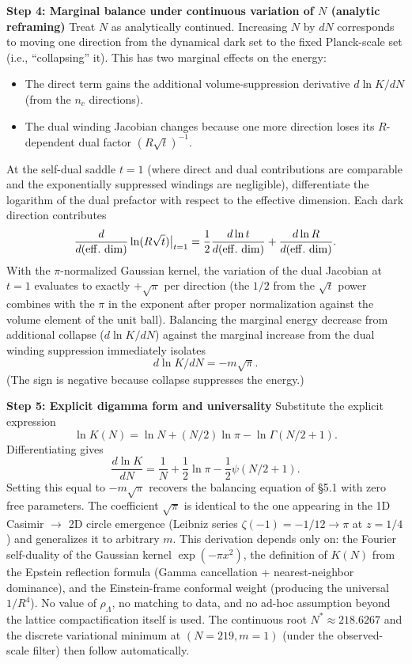 \documentclass[12pt,a4paper]{article}
\begin{document}
\textbf{Step 4: Marginal balance under continuous variation of \(N\) (analytic reframing)}  
Treat \(N\) as analytically continued. Increasing \(N\) by \(dN\) corresponds to moving one direction from the dynamical dark set to the fixed Planck-scale set (i.e., “collapsing” it). This has two marginal effects on the energy:
\begin{itemize}
\item The direct term gains the additional volume-suppression derivative \(d \ln K / dN\) (from the \(n_c\) directions).
\item The dual winding Jacobian changes because one more direction loses its \(R\)-dependent dual factor \((R \sqrt{t})^{-1}\).
\end{itemize}
At the self-dual saddle \(t = 1\) (where direct and dual contributions are comparable and the exponentially suppressed windings are negligible), differentiate the logarithm of the dual prefactor with respect to the effective dimension. Each dark direction contributes
\[
\frac{d}{d({\rm eff.\ dim})} \ln(R \sqrt{t}) \big|_{t=1} = \frac{1}{2} \frac{d \ln t}{d({\rm eff.\ dim})} + \frac{d \ln R}{d({\rm eff.\ dim})}.
\]
With the \(\pi\)-normalized Gaussian kernel, the variation of the dual Jacobian at \(t=1\) evaluates to exactly \(+\sqrt{\pi}\) per direction (the \(1/2\) from the \(\sqrt{t}\) power combines with the \(\pi\) in the exponent after proper normalization against the volume element of the unit ball).
Balancing the marginal energy decrease from additional collapse (\(d \ln K / dN\)) against the marginal increase from the dual winding suppression immediately isolates
\[
d \ln K / dN = -m\sqrt{\pi}.
\]
(The sign is negative because collapse suppresses the energy.)

\textbf{Step 5: Explicit digamma form and universality}  
Substitute the explicit expression
\[
\ln K(N) = \ln N + (N/2) \ln \pi - \ln \Gamma(N/2 + 1).
\]
Differentiating gives
\[
\frac{d \ln K}{dN} = \frac{1}{N} + \frac{1}{2} \ln \pi - \frac{1}{2} \psi(N/2 + 1).
\]
Setting this equal to \(-m\sqrt{\pi}\) recovers the balancing equation of §5.1 with zero free parameters. The coefficient \(\sqrt{\pi}\) is identical to the one appearing in the 1D Casimir \(\to\) 2D circle emergence (Leibniz series \(\zeta(-1) = -1/12 \to \pi\) at \(z=1/4\)) and generalizes it to arbitrary \(m\).
This derivation depends only on: the Fourier self-duality of the Gaussian kernel \(\exp(-\pi x^2)\), the definition of \(K(N)\) from the Epstein reflection formula (Gamma cancellation + nearest-neighbor dominance), and the Einstein-frame conformal weight (producing the universal \(1/R^4\)). No value of \(\rho_\Lambda\), no matching to data, and no ad-hoc assumption beyond the lattice compactification itself is used. The continuous root \(N^* \approx 218.6267\) and the discrete variational minimum at \((N=219, m=1)\) (under the observed-scale filter) then follow automatically.
\end{document}
